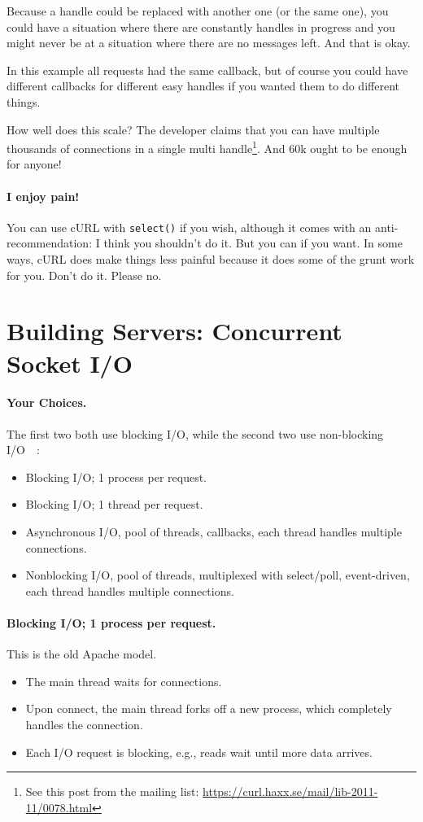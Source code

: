 \documentclass[a4paper]{report}
\begin{document}
Because a handle could be replaced with another one (or the same one), you could have a situation where there are constantly handles in progress and you might never be at a situation where there are no messages left. And that is okay.

In this example all requests had the same callback, but of course you could have different callbacks for different easy handles if you wanted them to do different things.

How well does this scale? The developer claims that you can have multiple thousands of connections in a single multi handle\footnote{See this post from the mailing list: \url{https://curl.haxx.se/mail/lib-2011-11/0078.html}}. And 60k ought to be enough for anyone!

\paragraph{I enjoy pain!} You can use cURL with \texttt{select()} if you wish, although it comes with an anti-recommendation: I think you shouldn't do it. But you can if you want. In some ways, cURL does make things less painful because it does some of the grunt work for you. Don't do it. Please no.

\section*{Building Servers: Concurrent Socket I/O}

\paragraph{Your Choices.} The first two both use blocking I/O, while the second two use
non-blocking I/O~~\cite{gplus:concurrent}:
    \begin{itemize}
      \item Blocking I/O; 1 process per request.
      \item Blocking I/O; 1 thread per request.
      \item Asynchronous I/O, pool of threads, callbacks, each thread handles multiple connections.
      \item Nonblocking I/O, pool of threads, multiplexed with select/poll,
        event-driven, each thread handles multiple connections.
    \end{itemize}

\paragraph{Blocking I/O; 1 process per request.}
This is the old Apache model.
  \begin{itemize}
    \item The main thread waits for connections.
    \item Upon connect, the main thread forks off a new process, which completely
      handles the connection.
    \item Each I/O request is blocking, e.g., reads wait until more data arrives.
  \end{itemize}
\end{document}
